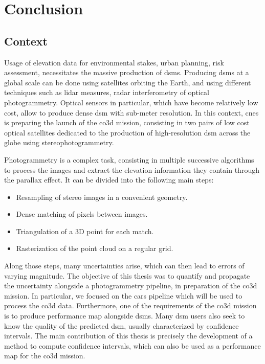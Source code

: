 \chapter*{Conclusion}
\section*{Context}
Usage of elevation data for environmental stakes, urban planning, risk assessment, \etc necessitates the massive production of \acrlong{dsm}s. Producing \acrshort{dsm}s at a global scale can be done using satellites orbiting the Earth, and using different techniques such as \acrshort{lidar} measures, radar interferometry of optical photogrammetry. Optical sensors in particular, which have become relatively low cost, allow to produce dense \acrshort{dsm} with sub-meter resolution. In this context, \acrshort{cnes} is preparing the launch of the \acrshort{co3d} mission, consisting in two pairs of low cost optical satellites dedicated to the production of high-resolution \acrshort{dsm} across the globe using stereophotogrammetry.

Photogrammetry is a complex task, consisting in multiple successive algorithms to process the images and extract the elevation information they contain through the parallax effect. It can be divided into the following main steps:
\begin{itemize}
    \item Resampling of stereo images in a convenient geometry.
    \item Dense matching of pixels between images.
    \item Triangulation of a 3D point for each match.
    \item Rasterization of the point cloud on a regular grid.
\end{itemize}
Along those steps, many uncertainties arise, which can then lead to errors of varying magnitude. The objective of this thesis was to quantify and propagate the uncertainty alongside a photogrammetry pipeline, in preparation of the \acrshort{co3d} mission. In particular, we focused on the \acrshort{cars} pipeline which will be used to process the \acrshort{co3d} data. Furthermore, one of the requirements of the \acrshort{co3d} mission is to produce performance map alongside \acrshort{dsm}s. Many \acrshort{dsm} users also seek to know the quality of the predicted \acrshort{dsm}, usually characterized by confidence intervals. The main contribution of this thesis is precisely the development of a method to compute confidence intervals, which can also be used as a performance map for the \acrshort{co3d} mission.

